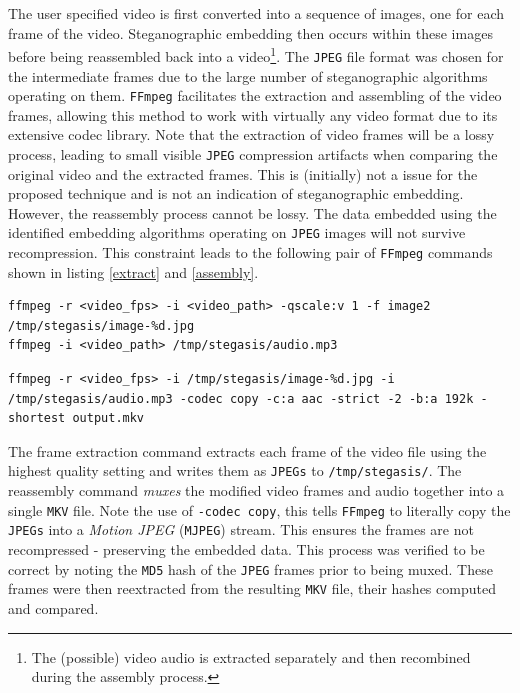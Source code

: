 \documentclass[paper=a4, fontsize=11pt,twoside]{scrartcl}    %
\numberwithin{table}{section}
\numberwithin{figure}{section}
\numberwithin{algorithm}{section}
\begin{document}
The user specified video is first converted into a sequence of images, one for each frame of the video. Steganographic embedding then occurs within these images before being reassembled back into a video\footnote{The (possible) video audio is extracted separately and then recombined during the assembly process.}. The \texttt{JPEG} file format was chosen for the intermediate frames due to the large number of steganographic algorithms operating on them. \texttt{FFmpeg} facilitates the extraction and assembling of the video frames, allowing this method to work with virtually any video format due to its extensive codec library. Note that the extraction of video frames will be a lossy process, leading to small visible \texttt{JPEG} compression artifacts when comparing the original video and the extracted frames. This is (initially) not a issue for the proposed technique and is not an indication of steganographic embedding. However, the reassembly process cannot be lossy. The data embedded using the identified embedding algorithms operating on \texttt{JPEG} images will not survive recompression. This constraint leads to the following pair of \texttt{FFmpeg} commands shown in listing \ref{extract} and \ref{assembly}.


\begin{lstlisting}[caption={\texttt{FFmpeg} frame extraction command.}, frame=single, label=extract,upquote=true,float,floatplacement=H]
ffmpeg -r <video_fps> -i <video_path> -qscale:v 1 -f image2 /tmp/stegasis/image-%d.jpg
ffmpeg -i <video_path> /tmp/stegasis/audio.mp3
\end{lstlisting}

\begin{lstlisting}[caption={\texttt{FFmpeg} video reassembly command.}, frame=single, label=assembly,upquote=true,float,floatplacement=H]
ffmpeg -r <video_fps> -i /tmp/stegasis/image-%d.jpg -i /tmp/stegasis/audio.mp3 -codec copy -c:a aac -strict -2 -b:a 192k -shortest output.mkv
\end{lstlisting}

The frame extraction command extracts each frame of the video file using the highest quality setting and writes them as \texttt{JPEGs} to \texttt{/tmp/stegasis/}. The reassembly command \textit{muxes} the modified video frames and audio together into a single \texttt{MKV} file. Note the use of \texttt{-codec copy}, this tells \texttt{FFmpeg} to literally copy the \texttt{JPEGs} into a \textit{Motion JPEG} (\texttt{MJPEG}) stream. This ensures the frames are not recompressed - preserving the embedded data. This process was verified to be correct by noting the \texttt{MD5} hash of the \texttt{JPEG} frames prior to being muxed. These frames were then reextracted from the resulting \texttt{MKV} file, their hashes computed and compared.
\end{document}
